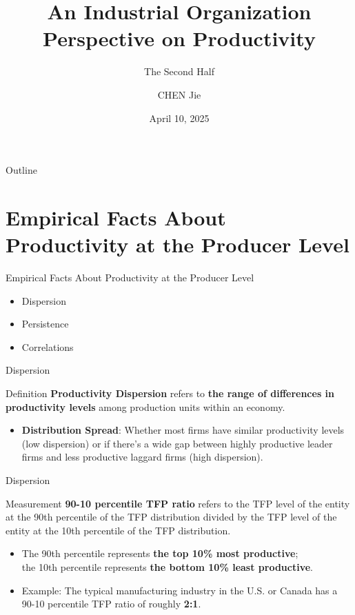 \documentclass[aspectratio=169]{beamer}  %
\title{An Industrial Organization Perspective on Productivity}
\subtitle{The Second Half}
\author{CHEN Jie}
\institute{Hong Kong University of Science and Technology}
\date{April 10, 2025}
\begin{document}
\begin{frame}
    \titlepage
\end{frame}

\begin{frame}{Outline}
    \tableofcontents
\end{frame}

\section{Empirical Facts About Productivity at the Producer Level}
\begin{frame}{Empirical Facts About Productivity at the Producer Level}
    \begin{itemize}
        \item Dispersion
        \item Persistence
        \item Correlations
    \end{itemize}
\end{frame}

\begin{frame}{Dispersion}
    \begin{block}{Definition}
        \textbf{Productivity Dispersion} refers to \textbf{the range of differences in productivity levels} among production units within an economy.
    \end{block}
    
    \begin{itemize}
        \item \textbf{Distribution Spread}: Whether most firms have similar productivity levels (low dispersion) or if there's a wide gap between highly productive leader firms and less productive laggard firms (high dispersion).
    \end{itemize}
\end{frame}


\begin{frame}{Dispersion}
    \begin{block}{Measurement}
        \textbf{90-10 percentile TFP ratio} refers to the TFP level of the entity at the 90th percentile of the TFP distribution divided by the TFP level of the entity at the 10th percentile of the TFP distribution.
    \end{block}

    \begin{itemize}
        \item The 90th percentile represents \textbf{the top 10\% most productive};\\
        the 10th percentile represents \textbf{the bottom 10\% least productive}.
        \item Example: The typical manufacturing industry in the U.S. or Canada has a 90-10 percentile TFP ratio of roughly \textbf{2:1}.
    \end{itemize}
\end{frame}
\end{document}
